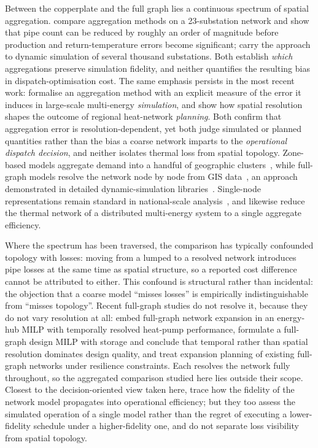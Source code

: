 Between the copperplate and the full graph lies a continuous spectrum of spatial
aggregation. \citet{Larsen2004} compare aggregation methods on a 23-substation network
and show that pipe count can be reduced by roughly an order of magnitude before
production and return-temperature errors become significant; \citet{Falay2020} carry the
approach to dynamic simulation of several thousand substations. Both establish
\emph{which} aggregations preserve simulation fidelity, and neither quantifies the
resulting bias in dispatch-optimisation cost. The same emphasis persists in the most
recent work: \citet{Vrain2025} formalise an aggregation method with an explicit measure of
the error it induces in large-scale multi-energy \emph{simulation}, and \citet{Cassetti2025}
show how spatial resolution shapes the outcome of regional heat-network \emph{planning}.
Both confirm that aggregation error is resolution-dependent, yet both judge simulated or
planned quantities rather than the bias a coarse network imparts to the \emph{operational
dispatch decision}, and neither isolates thermal loss from spatial topology. Zone-based models aggregate demand into a
handful of geographic clusters~\cite{Wirtz2020}, while full-graph models resolve
the network node by node from GIS data~\cite{vanderHeijde2017}, an approach demonstrated in
detailed dynamic-simulation libraries~\cite{Giraud2015}. Single-node
representations remain standard in national-scale
analysis~\cite{Connolly2014_EnergyPLAN}, and \citet{Gabrielli2018} likewise reduce the
thermal network of a distributed multi-energy system to a single aggregate efficiency.

Where the spectrum has been traversed, the comparison has typically confounded topology
with losses: moving from a lumped to a resolved network introduces pipe losses at the same
time as spatial structure, so a reported cost difference cannot be attributed to either.
This confound is structural rather than incidental: the objection that a coarse model
``misses losses'' is empirically indistinguishable from ``misses topology''. Recent full-graph studies do not resolve it,
because they do not vary resolution at all: \citet{Trentmann2026} embed full-graph
network expansion in an energy-hub MILP with temporally resolved heat-pump performance,
\citet{Ceruti2025} formulate a full-graph design MILP with storage and conclude that
temporal rather than spatial resolution dominates design quality, and
\citet{Vieth2026} treat expansion planning of existing full-graph networks under
resilience constraints. Each resolves the network fully throughout, so the aggregated
comparison studied here lies outside their scope. Closest to the decision-oriented view
taken here, \citet{Friedrich2025} trace how the fidelity of the network model propagates
into operational efficiency; but they too assess the simulated operation of a single model
rather than the regret of executing a lower-fidelity schedule under a higher-fidelity one,
and do not separate loss visibility from spatial topology.

